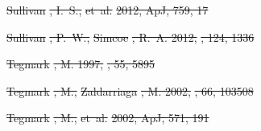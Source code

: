 \documentclass[numberedappendix]{emulateapj}
\providecommand{\DIFdel}[1]{{\protect\color{red}\sout{#1}}}                      %
\begin{document}
\DIFdel{Sullivan}%
\DIFdel{, I.~S., }%
\DIFdel{et~al.}%
\DIFdel{2012, ApJ, 759, 17
}%

\DIFdel{Sullivan}%
\DIFdel{, P.~W., }%
\DIFdel{Simcoe}%
\DIFdel{, R.~A. 2012, }%
\DIFdel{, 124, 1336
}%

\DIFdel{Tegmark}%
\DIFdel{, M. 1997, }%
\DIFdel{, 55, 5895
}%

\DIFdel{Tegmark}%
\DIFdel{, M., }%
\DIFdel{Zaldarriaga}%
\DIFdel{, M. 2002, }%
\DIFdel{, 66, 103508
}%

\DIFdel{Tegmark}%
\DIFdel{, M., }%
\DIFdel{et~al.}%
\DIFdel{2002, ApJ, 571, 191
}%
\end{document}
